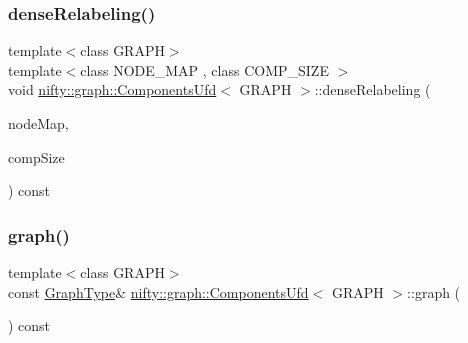 \subsubsection{\texorpdfstring{dense\+Relabeling()}{denseRelabeling()}\hspace{0.1cm}{\footnotesize\ttfamily [2/2]}}
{\footnotesize\ttfamily template$<$class G\+R\+A\+PH$>$ \\
template$<$class N\+O\+D\+E\+\_\+\+M\+AP , class C\+O\+M\+P\+\_\+\+S\+I\+ZE $>$ \\
void \hyperlink{classnifty_1_1graph_1_1ComponentsUfd}{nifty\+::graph\+::\+Components\+Ufd}$<$ G\+R\+A\+PH $>$\+::dense\+Relabeling (\begin{DoxyParamCaption}\item[{N\+O\+D\+E\+\_\+\+M\+AP \&}]{node\+Map,  }\item[{C\+O\+M\+P\+\_\+\+S\+I\+ZE \&}]{comp\+Size }\end{DoxyParamCaption}) const\hspace{0.3cm}{\ttfamily [inline]}}

\mbox{\label{classnifty_1_1graph_1_1ComponentsUfd_a98cca33e98d6e1d9172c6fe65ceae849}} 
\subsubsection{\texorpdfstring{graph()}{graph()}}
{\footnotesize\ttfamily template$<$class G\+R\+A\+PH$>$ \\
const \hyperlink{classnifty_1_1graph_1_1ComponentsUfd_a022ccf51b6dd4a943d3d614b97faa783}{Graph\+Type}\& \hyperlink{classnifty_1_1graph_1_1ComponentsUfd}{nifty\+::graph\+::\+Components\+Ufd}$<$ G\+R\+A\+PH $>$\+::graph (\begin{DoxyParamCaption}{ }\end{DoxyParamCaption}) const\hspace{0.3cm}{\ttfamily [inline]}}

\mbox{\label{classnifty_1_1graph_1_1ComponentsUfd_a675a98fdcf175d7157041633cde35c37}} 
